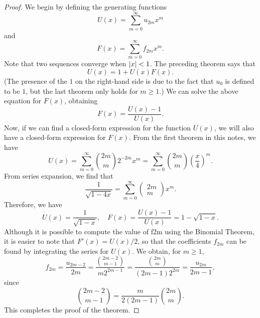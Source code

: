 \begin{proof}
We begin by defining the generating functions
\begin{equation*}
    U(x)=\sum_{m=0}^{\infty} u_{2 m} x^{m}
\end{equation*}
and 
\begin{equation*}
    F(x)=\sum_{m=0}^{\infty} f_{2 m} x^{m}.
\end{equation*}
Note that two sequences converge when $\left\vert x \right\vert<1$. The preceding theorem says that 
\begin{equation*}
    U(x)=1+U(x) F(x).
\end{equation*}
(The presence of the $1$ on the right-hand side is due to the fact that $u_0$ is defined to be $1$, but the last theorem only holds for $m \geq 1$.) We can solve the above equation for $F(x)$, obtaining
\begin{equation*}
    F(x)=\frac{U(x)-1}{U(x)}.
\end{equation*}
Now, if we can find a closed-form expression for the function $U(x)$, we will also have a closed-form expression for $F(x)$. From the first theorem in this notes, we have
\begin{equation*}
    U(x)=\sum_{m=0}^{\infty}\binom{2m}{m} 2^{-2 m} x^{m} = \sum_{m=0}^\infty \binom{2m}{m} \left( \frac{x}{4} \right)^m.
\end{equation*}
From series expansion, we find that 
\begin{equation*}
    \frac{1}{\sqrt{1-4 x}}=\sum_{m=0}^{\infty}\left(\begin{array}{c}{2 m} \\ {m}\end{array}\right) x^{m}.
\end{equation*}
Therefore, we have 
\begin{equation*}
    U(x)=\frac{1}{\sqrt{1-x}}, \quad F(x) = \frac{U(x)-1}{U(x)} = 1-\sqrt{1-x}.
\end{equation*}
Although it is possible to compute the value of f2m using the Binomial Theorem, it is easier to note that $F'(x) = U(x)/2$, so that the coefficients $f_{2m}$ can be found by integrating the series for $U(x)$. We obtain, for $m \geq 1$, 
\begin{equation*}
    f_{2 m}=\frac{u_{2 m-2}}{2 m} = \frac{\binom{2m-2}{m-1}}{m 2^{2 m-1}} = \frac{\binom{2m}{m}}{(2 m-1) 2^{2 m}} = \frac{u_{2m}}{2m-1},
\end{equation*}
since
\begin{equation*}
    \binom{2m-2}{m-1} = \frac{m}{2(2 m-1)}\binom{2m}{m}.
\end{equation*}
This completes the proof of the theorem.
\end{proof}

